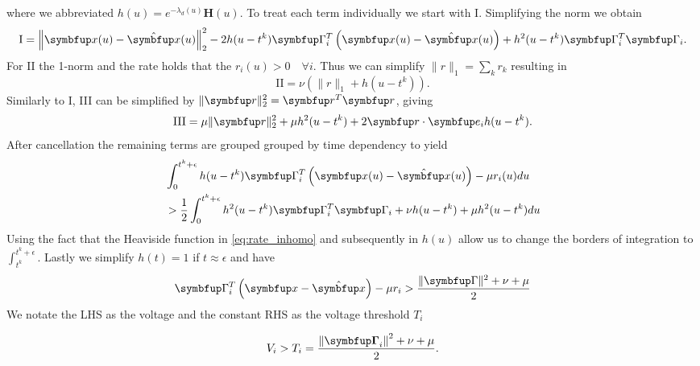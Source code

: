 where we abbreviated $h(u) = e^{-\lambda_d (u)} \bm{H}(u)$.
To treat each term individually we start with I. Simplifying the norm we obtain
\begin{equation}
	\text{I} = \left\|\bmu{x}(u)-\hat{\bmu{x}}(u)\right\|_2^2 -2h(u-t^k)\bmu{\Gamma}_i^T\left(\bmu{x}(u)-\hat{\bmu{x}}(u)\right) + h^2(u-t^k)\bmu{\Gamma}_i^T\bmu{\Gamma}_i.
\end{equation}
For II the 1-norm and the rate holds that the $r_i(u)>0 \quad
\forall i$. Thus we can simplify $\|r\|_1 = \sum_k r_k$ resulting in
\begin{equation}
	\text{II} = \nu\left(\|r\|_1 + h(u-t^k)\right).
\end{equation}
Similarly to I, III can be simplified by $\|\bmu{r}\|^2_2 = \bmu{r}^T\bmu{r}$, giving
\begin{equation}
	\text{III} = \mu\|\bmu{r}\|^2_2 + \mu h^2(u-t^k) + 2\bmu{r}\cdot\bmu{e}_ih(u-t^k).
\end{equation}
After cancellation the remaining terms are grouped grouped by time dependency to yield
\begin{equation}
\begin{aligned}
	&\int_0^{t^k+\epsilon}h(u-t^k)\bmu{\Gamma}_i^T\left(\bmu{x}(u)-\hat{\bmu{x}}(u)\right) - \mu r_i(u) d u \\
	&> \frac{1}{2} \int_0^{t^k+\epsilon} 	h^2(u-t^k)\bmu{\Gamma}_i^T\bmu{\Gamma}_i + 	\nu h(u-t^k) + \mu h^2(u-t^k) d u
\end{aligned}
\end{equation}
Using the fact that the Heaviside function in \cref{eq:rate_inhomo} and subsequently in $h(u)$ allow us to change the borders of integration to $\int_{t^k}^{t^k+\epsilon}$. Lastly we simplify $h(t) = 1$ if $t\approx \epsilon$ and have
\begin{equation}
	\bmu{\Gamma}_i^T\left(\bmu{x}-\hat{\bmu{x}}\right) - \mu r_i>\frac{\|\bmu{\Gamma}\|^2 + \nu + \mu}{2}
\end{equation}
We notate the \ac{LHS} as the voltage and the constant \ac{RHS} as the voltage threshold $T_i$


\begin{equation}\label{eq:condition}
V_i>T_i=\frac{\left\|\boldsymbol{\bmu{\Gamma}}_i\right\|^2 + \nu+\mu}{2}.
\end{equation}



